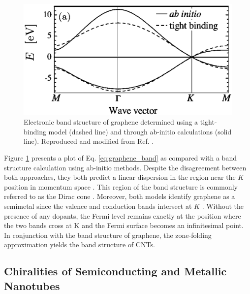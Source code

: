 \begin{figure}[h]
	\centering
	\includegraphics[scale=0.5]{images/chapter_optical_props/graphene_band_charlier}
	\caption{Electronic band structure of graphene determined using a tight-binding model (dashed line) and through ab-initio calculations (solid line). Reproduced and modified from Ref. \cite{reich2002tight}.}
	\label{fig:graphene_band}
\end{figure}
%
Figure \ref{fig:graphene_band} presents a plot of Eq. \ref{eq:graphene_band} as compared with a band structure calculation using ab-initio methods. Despite the disagreement between both approaches, they both predict a linear dispersion in the region near the $K$ position in momentum space \cite{charlier2007electronic}. This region of the band structure is commonly referred to as the Dirac cone	\cite{charlier2007electronic}. Moreover, both models identify graphene as a semimetal since the valence and conduction bands intersect at $K$ \cite{charlier2007electronic}. Without the presence of any dopants, the Fermi level remains exactly at the position where the two bands cross at K and the Fermi surface becomes an infinitesimal point. In conjunction with the band structure of graphene, the zone-folding approximation yields the band structure of CNTs. 



\subsection{Chiralities of Semiconducting and Metallic Nanotubes}

